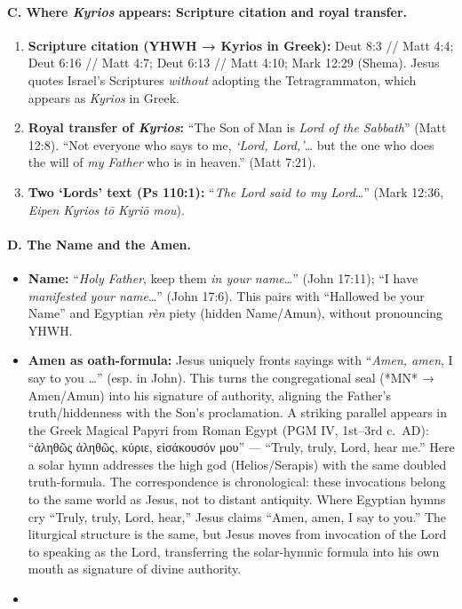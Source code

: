 \paragraph{C. Where \emph{Kyrios} appears: Scripture citation and royal transfer.}
\begin{enumerate}
  \item \textbf{Scripture citation (YHWH → Kyrios in Greek):} Deut 8:3 // Matt 4:4; Deut 6:16 // Matt 4:7; Deut 6:13 // Matt 4:10; Mark 12:29 (Shema). Jesus quotes Israel’s Scriptures \emph{without} adopting the Tetragrammaton, which appears as \emph{Kyrios} in Greek.
  \item \textbf{Royal transfer of \emph{Kyrios}:} “The Son of Man is \emph{Lord of the Sabbath}” (Matt 12:8). “Not everyone who says to me, \emph{‘Lord, Lord,’}… but the one who does the will of \emph{my Father} who is in heaven.” (Matt 7:21).
  \item \textbf{Two ‘Lords’ text (Ps 110:1):} “\emph{The Lord said to my Lord}…” (Mark 12:36, \emph{Eipen Kyrios tō Kyriō mou}).
\end{enumerate}

\paragraph{D. The Name and the Amen.}
\begin{itemize}
  \item \textbf{Name:} “\emph{Holy Father}, keep them \emph{in your name}…” (John 17:11); “I have \emph{manifested your name}…” (John 17:6). This pairs with “Hallowed be your Name” and Egyptian \emph{r\`en} piety (hidden Name/Amun), without pronouncing YHWH.
  \item \textbf{Amen as oath-formula:} Jesus uniquely fronts sayings with “\emph{Amen, amen}, I say to you …” (esp. in John). This turns the congregational seal (*MN* → Amen/Amun) into his signature of authority, aligning the Father’s truth/hiddenness with the Son’s proclamation. A striking parallel appears in the Greek Magical Papyri from Roman Egypt (PGM IV, 1st–3rd c.~AD): “ἀληθῶς ἀληθῶς, κύριε, εἰσάκουσόν μου” — “Truly, truly, Lord, hear me.” Here a solar hymn addresses the high god (Helios/Serapis) with the same doubled truth-formula. The correspondence is chronological: these invocations belong to the same world as Jesus, not to distant antiquity. Where Egyptian hymns cry “Truly, truly, Lord, hear,” Jesus claims “Amen, amen, I say to you.” The liturgical structure is the same, but Jesus moves from invocation of the Lord to speaking as the Lord, transferring the solar-hymnic formula into his own mouth as signature of divine authority.
\item \end{itemize}


